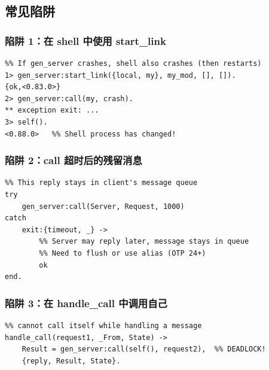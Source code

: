 \documentclass[a4paper,11pt]{article}
\begin{document}
\subsection{常见陷阱}

\subsubsection{陷阱 1：在 shell 中使用 start\_link}

\begin{lstlisting}[style=erlangstyle, caption={Shell 中 start\_link 的陷阱}]
%% Shell process and gen_server are linked
%% If gen_server crashes, shell also crashes (then restarts)
1> gen_server:start_link({local, my}, my_mod, [], []).
{ok,<0.83.0>}
2> gen_server:call(my, crash).
** exception exit: ...
3> self().
<0.88.0>   %% Shell process has changed!
\end{lstlisting}

\subsubsection{陷阱 2：call 超时后的残留消息}

\begin{lstlisting}[style=erlangstyle, caption={超时后的残留消息问题}]
%% After client timeout, server's reply still arrives
%% This reply stays in client's message queue
try
    gen_server:call(Server, Request, 1000)
catch
    exit:{timeout, _} ->
        %% Server may reply later, message stays in queue
        %% Need to flush or use alias (OTP 24+)
        ok
end.
\end{lstlisting}

\subsubsection{陷阱 3：在 handle\_call 中调用自己}

\begin{lstlisting}[style=erlangstyle, caption={死锁！不要在 handle\_call 中调用自己}]
%% DEADLOCK! gen_server is single-process,
%% cannot call itself while handling a message
handle_call(request1, _From, State) ->
    Result = gen_server:call(self(), request2),  %% DEADLOCK!
    {reply, Result, State}.
\end{lstlisting}
\end{document}
